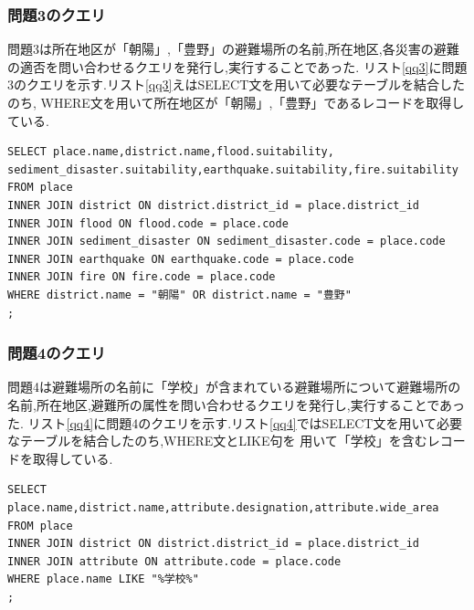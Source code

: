 \documentclass[a4j]{jarticle}
\begin{document}
    \subsubsection{問題3のクエリ}
問題3は所在地区が「朝陽」,「豊野」の避難場所の名前,所在地区,各災害の避難の適否を問い合わせるクエリを発行し,実行することであった.
リスト\ref{qq3}に問題3のクエリを示す.リスト\ref{qq3}えはSELECT文を用いて必要なテーブルを結合したのち,
WHERE文を用いて所在地区が「朝陽」,「豊野」であるレコードを取得している.
\begin{lstlisting}[basicstyle=\ttfamily\footnotesize, frame=single,label=qq3,caption=問題3のクエリ]
SELECT place.name,district.name,flood.suitability,
sediment_disaster.suitability,earthquake.suitability,fire.suitability
FROM place
INNER JOIN district ON district.district_id = place.district_id
INNER JOIN flood ON flood.code = place.code
INNER JOIN sediment_disaster ON sediment_disaster.code = place.code
INNER JOIN earthquake ON earthquake.code = place.code
INNER JOIN fire ON fire.code = place.code
WHERE district.name = "朝陽" OR district.name = "豊野" 
;
      \end{lstlisting}

    \subsubsection{問題4のクエリ}
問題4は避難場所の名前に「学校」が含まれている避難場所について避難場所の名前,所在地区,避難所の属性を問い合わせるクエリを発行し,実行することであった.
リスト\ref{qq4}に問題4のクエリを示す.リスト\ref{qq4}ではSELECT文を用いて必要なテーブルを結合したのち,WHERE文とLIKE句を
用いて「学校」を含むレコードを取得している.
\begin{lstlisting}[basicstyle=\ttfamily\footnotesize, frame=single,label=qq4,caption=問題4のクエリ]
SELECT place.name,district.name,attribute.designation,attribute.wide_area
FROM place
INNER JOIN district ON district.district_id = place.district_id
INNER JOIN attribute ON attribute.code = place.code
WHERE place.name LIKE "%学校%"
;
\end{lstlisting}
\end{document}
